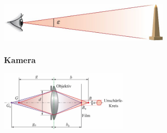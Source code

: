 \begin{center}
	\begin{minipage}{0.2\textwidth}
		 \\
		 \\
		 \\
	\end{minipage}%
	\begin{minipage}{0.3\textwidth}
		\includegraphics[height=2cm,keepaspectratio=true]{Images/sehwinkel.png}
	\end{minipage}
\end{center}




\subsubsection{Kamera}

\begin{center}
	\begin{minipage}{0.26\textwidth}
	\end{minipage}%
	\begin{minipage}{0.3\textwidth}
		\includegraphics[height=3cm,keepaspectratio=true]{Images/kamera.png}
	\end{minipage}
\end{center}


